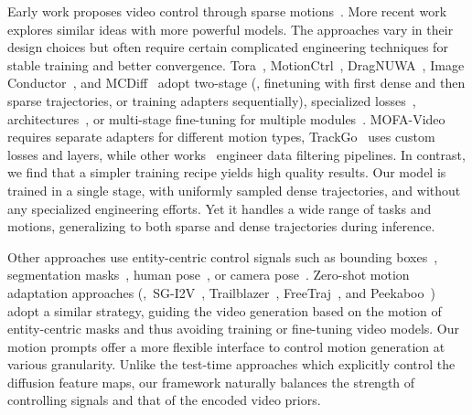 Early work proposes video control through sparse motions~\cite{hao2018controllable,ardino2021click}. More recent work explores similar ideas with more powerful models. %
The approaches vary in their design choices but often require certain complicated engineering techniques for stable training and better convergence.
Tora~\cite{zhang2024tora}, MotionCtrl~\cite{wang2024motionctrl}, DragNUWA~\cite{yin2023dragnuwa}, Image Conductor~\cite{li2024image}, and MCDiff~\cite{chen2023mcdiff} adopt two-stage (\eg, finetuning with first dense and then sparse trajectories, or training adapters sequentially), specialized losses~\cite{li2024image,namekata2024sg}, architectures~\cite{xiao2024trajectory,feng2024i2vcontrol}, or multi-stage fine-tuning for multiple modules~\cite{2023videocomposer,chen2023mcdiff,shi2024motion}.
MOFA-Video~\cite{niu2024mofa} requires separate adapters for different motion types, TrackGo~\cite{zhou2024trackgo} uses custom losses and layers, while other works~\cite{yin2023dragnuwa,wang2024motionctrl,niu2024mofa,li2024image,zhang2024tora} engineer data filtering pipelines.
In contrast, we find that a simpler training recipe yields high quality results. Our model is trained in a single stage, with uniformly sampled dense trajectories, and without any specialized engineering efforts. %
Yet it handles a wide range of tasks and motions, generalizing to both sparse and dense trajectories during inference.

Other approaches use entity-centric control signals such as bounding boxes~\cite{wu2024motionbooth,wang2024boximator}, segmentation masks~\cite{wu2024draganything, dai2023finegrained}, human pose~\cite{hu2023animateanyone,xu2023magicanimate}, or camera pose~\cite{he2024cameractrl,watson2024controlling}.
Zero-shot motion adaptation approaches (\eg,~SG-I2V~\cite{namekata2024sg}, Trailblazer~\cite{ma2023trailblazer}, FreeTraj~\cite{qiu2024freetraj}, and Peekaboo~\cite{jain2024peekaboo}) adopt a similar strategy, guiding the video generation based on the motion of entity-centric masks and thus avoiding training or fine-tuning video models.
Our motion prompts offer a more flexible interface to control motion generation at various granularity. Unlike the test-time approaches which explicitly control the diffusion feature maps, our framework naturally balances the strength of controlling signals and that of the encoded video priors.

